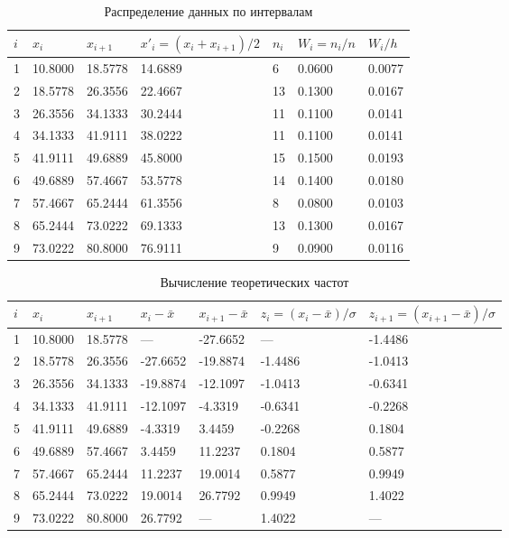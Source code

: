 \documentclass{article}
\theoremstyle{problemstyle}
\begin{document}
\begin{table}[ht!]
  \centering
  \begin{tabular}{|l|l|l|l|l|l|l|}
    \hline
    \(i\) & \(x_i\) & \(x_{i+1}\) & \(x'_i = (x_i + x_{i+1})/2\) & \(n_i\) & \(W_i = n_i/n\) & \(W_i/h\) \\
    \hline
1 & 10.8000 & 18.5778 & 14.6889 & 6 & 0.0600 & 0.0077  \\
    \hline
2 & 18.5778 & 26.3556 & 22.4667 & 13 & 0.1300 & 0.0167 \\
    \hline
3 & 26.3556 & 34.1333 & 30.2444 & 11 & 0.1100 & 0.0141 \\
    \hline
4 & 34.1333 & 41.9111 & 38.0222 & 11 & 0.1100 & 0.0141 \\
    \hline
5 & 41.9111 & 49.6889 & 45.8000 & 15 & 0.1500 & 0.0193 \\
    \hline
6 & 49.6889 & 57.4667 & 53.5778 & 14 & 0.1400 & 0.0180 \\
    \hline
7 & 57.4667 & 65.2444 & 61.3556 & 8 & 0.0800 & 0.0103 \\
    \hline
8 & 65.2444 & 73.0222 & 69.1333 & 13 & 0.1300 & 0.0167 \\
    \hline
9 & 73.0222 & 80.8000 & 76.9111 & 9 & 0.0900 & 0.0116 \\
    \hline
  \end{tabular}
  \caption{Распределение данных по интервалам}\label{table:intervals}
\end{table}

\begin{table}[ht!]
  \centering
  \begin{tabular}{|l|l|l|l|l|l|l|}
    \hline
    \(i\) & \(x_i\) & \(x_{i+1}\) & \(x_i - \bar x\) & \(x_{i+1} - \bar x\)
    & \(z_i = (x_i -\bar x)/\sigma\) & \(z_{i+1} = (x_{i+1} - \bar x)/\sigma\) \\
\hline
1 & 10.8000 & 18.5778 & --- & -27.6652 & --- & -1.4486 \\
\hline
2 & 18.5778 & 26.3556 & -27.6652 & -19.8874 & -1.4486 & -1.0413 \\
\hline
3 & 26.3556 & 34.1333 & -19.8874 & -12.1097 & -1.0413 & -0.6341 \\
\hline
4 & 34.1333 & 41.9111 & -12.1097 & -4.3319 & -0.6341 & -0.2268 \\
\hline
5 & 41.9111 & 49.6889 & -4.3319 & 3.4459 & -0.2268 & 0.1804 \\
\hline
6 & 49.6889 & 57.4667 & 3.4459 & 11.2237 & 0.1804 & 0.5877 \\
\hline
7 & 57.4667 & 65.2444 & 11.2237 & 19.0014 & 0.5877 & 0.9949 \\
\hline
8 & 65.2444 & 73.0222 & 19.0014 & 26.7792 & 0.9949 & 1.4022 \\
\hline
9 & 73.0222 & 80.8000 & 26.7792 & --- & 1.4022 & --- \\
\hline
  \end{tabular}
  \caption{Вычисление теоретических частот}\label{table:theoretical}
\end{table}
\end{document}
